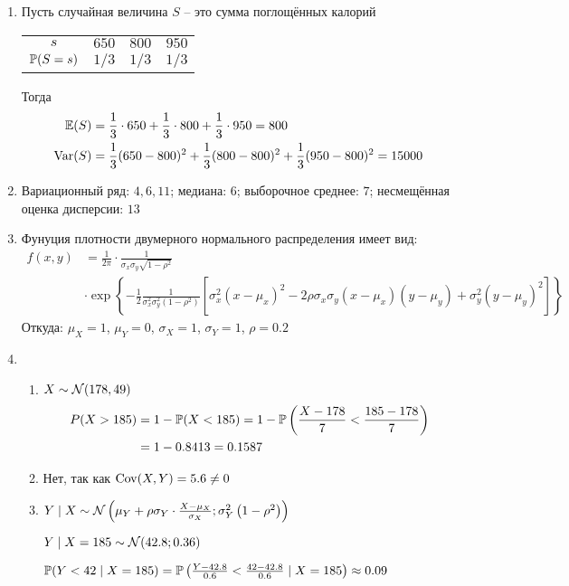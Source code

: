 \begin{enumerate}
\item Пусть случайная величина $S$ – это сумма поглощённых калорий

\begin{center}
\begin{tabular}{cccc}
\toprule
$s$ & $650$ & $800$ & $950$ \\
$\P(S = s)$ & $1/3$ & $1/3$ & $1/3$ \\ \bottomrule
\end{tabular}
\end{center}

Тогда
\begin{align*}
\E(S) &= \frac{1}{3}\cdot 650 +  \frac{1}{3}\cdot 800 +  \frac{1}{3}\cdot 950 = 800 \\
\Var(S) &= \frac{1}{3}(650-800)^2 + \frac{1}{3}(800-800)^2 + \frac{1}{3}(950-800)^2 = 15000
\end{align*}
\item Вариационный ряд: $4, 6, 11$; медиана: $6$; выборочное среднее: $7$;
несмещённая оценка дисперсии: $13$
\item Фунуция плотности двумерного нормального распределения имеет вид:
\begin{align*}
f(x,y) &= \frac{1}{2\pi}\cdot \frac{1}{\sigma_x \sigma_y \sqrt{1-\rho^2}} \\
&\cdot \exp\left\{{-\frac{1}{2}\frac{1}{\sigma_x^2 \sigma_y^2\left(1-\rho^2\right)}\left[\sigma_x^2(x-\mu_x)^2-2\rho\sigma_x\sigma_y(x-\mu_x)(y-\mu_y)+\sigma_y^2(y-\mu_y)^2\right]}\right\}
\end{align*}
Откуда: $\mu_X=1$, $\mu_Y=0$, $\sigma_X = 1$, $\sigma_Y = 1$, $\rho = 0.2$

\item
\begin{enumerate}
\item $X \sim \cN(178, 49)$
\begin{align*}
P(X>185) &= 1  - \P(X<185) = 1- \P\left(\frac{X-178}{7} < \frac{185-178}{7}\right) \\
&= 1 - 0.8413 = 0.1587
\end{align*}
\item Нет, так как $\Cov(X, Y) = 5.6 \neq 0$
\item $Y \mid X \sim \cN\left(\mu_Y + \rho\sigma_Y\cdot\frac{X-\mu_X}{\sigma_X}; \sigma_Y^2\left(1-\rho^2\right)\right)$

$Y \mid X=185 \sim \cN(42.8;0.36)$

$\P(Y<42 \mid X=185) = \P\left(\frac{Y-42.8}{0.6} < \frac{42-42.8}{0.6}\mid X=185\right) \approx 0.09$
\end{enumerate}


\end{enumerate}
